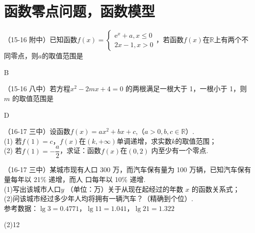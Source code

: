 \section{函数零点问题，函数模型}
  \begin{exercise}{}
    \item
      （15-16 附中）已知函数$f(x)=\begin{cases}\mathrm{e}^x+a,x\leq0\\2x-1,x>0 \end{cases} $，若函数$f(x)$在$\mathbb{R}$上有两个不同零点，则$a$的取值范围是\xz
      \xx{$[-1,+\infty)$}{$(-1,+\infty)$}{$(-1,0)$}{$[-1,0)$}
      \begin{answer}
        B
      \end{answer}
    \item
      （15-16 八中）若方程$x^2-2mx+4=0$ 的两根满足一根大于 1，一根小于 1，则$m$ 的取值范围是\xz
      \begin{answer}
        D
      \end{answer}
    \item
      （16-17 三中）设函数$f(x)=ax^2+bx+c$,（$a>0,b,c\in\mathbb{R}$）.\\
      (1) 若$f(1)=c$，$f(x)$在$(k,+\infty)$单调递增，求实数$k$的取值范围；\\
      (2) 若$f(1)=-\dfrac a2$，求证：函数$f(x)$在$(0,2)$ 内至少有一个零点.
    \vspace{15em}
    \item
      （16-17 三中）某城市现有人口 300 万，而汽车保有量为 100 万辆，已知汽车保有量每年以 21\% 递增，而人 口每年以 10\% 递增.\\
      (1)写出该城市人口$y$ （单位：万）关于从现在起经过的年数 $x$ 的函数关系式；\\ (2)问该城市经过多少年人均将拥有一辆汽车？（精确到个位）.\\
      参考数据：$\lg3=0.4771$，$\lg11=1.041$，$\lg21=1.322$
      \begin{answer}
        (2)12
      \end{answer}
    \vspace{14em}
  \end{exercise}
